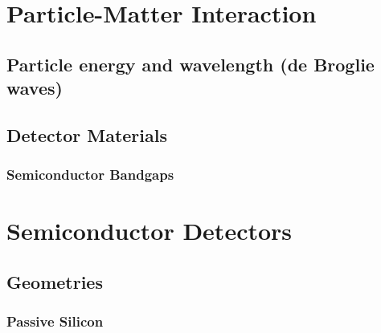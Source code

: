 \hypertarget{particle-matter-interaction}{%
\section{Particle-Matter
Interaction}\label{particle-matter-interaction}}

\hypertarget{particle-energy-and-wavelength-de-broglie-waves}{%
\subsection{Particle energy and wavelength (de Broglie
waves)}\label{particle-energy-and-wavelength-de-broglie-waves}}

\hypertarget{detector-materials}{%
\subsection{Detector Materials}\label{detector-materials}}

\hypertarget{semiconductor-bandgaps}{%
\subsubsection{Semiconductor Bandgaps}\label{semiconductor-bandgaps}}

\hypertarget{section}{%
\subsubsection{}\label{section}}

\hypertarget{semiconductor-detectors}{%
\section{Semiconductor Detectors}\label{semiconductor-detectors}}

\hypertarget{geometries}{%
\subsection{Geometries}\label{geometries}}

\hypertarget{passive-silicon}{%
\subsubsection{Passive Silicon}\label{passive-silicon}}
